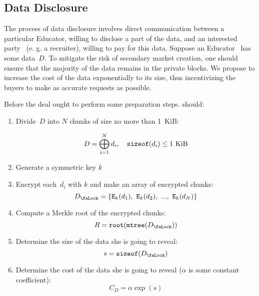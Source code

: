 \subsection{Data Disclosure}
\label{sec:DataDisclosure}
The process of data disclosure involves direct communication between a particular Educator, willing to disclose a part of the data, and an interested party~ (e. g. a recruiter), willing to pay for this data. Suppose an Educator~ has some data~$D$. To mitigate the risk of secondary market creation, one should ensure that the majority of the data remains in the private blocks. We propose to increase the cost of the data exponentially to its size, thus incentivizing the buyers to make as accurate requests as possible.

 Before the deal  ought to perform some preparation steps.  should:
\begin{enumerate}
\item Divide~$D$ into $N$ chunks of size no more than 1~KiB:

\begin{equation}
D = \bigoplus_{i=1}^N d_i, \quad \mathtt{sizeof}(d_i) \leq 1~\mathrm{KiB}
\end{equation}

\item Generate a symmetric key $k$
\item Encrypt each~$d_i$ with $k$ and make an array of encrypted chunks:
\begin{equation}
\Lock{D} = \{ \Encrypt_\Key{k}(d_1),\ \Encrypt_\Key{k}(d_2),\ ...,\ \Encrypt_\Key{k}(d_N) \}
\end{equation}

\item Compute a Merkle root of the encrypted chunks:
\begin{equation}
R = \Root(\MerkleTree(\Lock{D}))
\end{equation}

\item Determine the size of the data she is going to reveal:
\begin{equation}
s = \SizeOf(\Lock{D})
\end{equation}

\item Determine the cost of the data she is going to reveal ($\alpha$ is some constant coefficient):
\begin{equation}
C_D = \alpha \operatorname{exp}(s)
\end{equation}
\end{enumerate}

